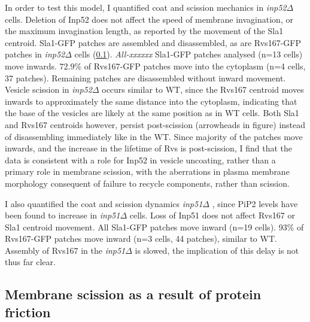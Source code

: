 		\vspace{5mm}
		In order to test this model, I quantified coat and scission mechanics in \textit{inp52$\Delta$ } cells.
		Deletion of Inp52 does not affect the speed of membrane invagination, or the maximum invagination length, as reported by the movement of the Sla1 centroid. Sla1-GFP patches are assembled and disassembled, as are Rvs167-GFP patches in \textit{inp52$\Delta$ } cells (\ref{}). \textit{All-xxxxxx} Sla1-GFP patches analysed (n=13 cells) move inwards. 72.9\% of Rvs167-GFP patches move into the cytoplasm (n=4 cells, 37 patches). Remaining patches are disassembled without inward movement. Vesicle scission in \textit{inp52$\Delta$ }occurs similar to WT, since the Rvs167 centroid moves inwards to approximately the same distance into the cytoplasm, indicating that the base of the vesicles are likely at the same position as in WT cells. Both Sla1 and Rvs167 centroids however, persist post-scission (arrowheads in figure) instead of disassembling immediately like in the WT. Since majority of the patches move inwards, and the increase in the lifetime of Rvs is post-scission, I find that the data is consistent with a role for Inp52 in vesicle uncoating, rather than a primary role in membrane scission, with the aberrations in plasma membrane morphology consequent of failure to recycle components, rather than scission. 


		\vspace{5mm}
		I also quantified the coat and scission dynamics \textit{inp51$\Delta$ }, since PiP2 levels have been found to increase in \textit{inp51$\Delta$ } cells. Loss of Inp51 does not affect Rvs167 or Sla1 centroid movement. All Sla1-GFP patches move inward (n=19 cells). 93\% of Rvs167-GFP patches move inward (n=3 cells, 44 patches), similar to WT. Assembly of Rvs167 in the \textit{inp51$\Delta$ }is slowed, the implication of this delay is not thus far clear. 


	
	\subsection{Membrane scission as a result of protein friction}
	
